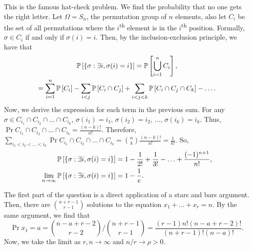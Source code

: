 \begin{solution}
    This is the famous hat-check problem. We find the probability that no one
    gets the right letter. Let $\Omega = S_n$, the permutation group of $n$
    elements, also let $C_i$ be the set of all permutations where the
    $i$\textsuperscript{th} element is in the $i$\textsuperscript{th} position.
    Formally, $\sigma \in C_i$ if and only if $\sigma(i) = i$. Then, by the
    inclusion-exclusion principle, we have that 
    \begin{gather*}
        \mathbb{P}\left[\left\{ \sigma: \exists i, \sigma(i) = i \right\}\right] = \mathbb{P}\left[\bigcup_{i=1}^n C_i\right], \\
        = \sum_{i=1}^n \mathbb{P}\left[C_i\right] - \sum_{i < j} \mathbb{P}\left[C_i \cap C_j\right] + \sum_{i < j < k} \mathbb{P}\left[C_i \cap C_j \cap C_k\right] - \ldots.
    \end{gather*}
    Now, we derive the expression for each term in the previous sum. For any
    $\sigma \in C_{i_1} \cap C_{i_2} \cap \ldots \cap C_{i_k}$, $\sigma(i_1) =
    i_1$, $\sigma(i_2) = i_2$, $\ldots$, $\sigma(i_k) = i_k$. Thus, $\Pr{C_{i_1}
    \cap C_{i_2} \cap \ldots \cap C_{i_k}} = \frac{(n-k)!}{n!}$. Therefore,
    $\sum_{i_1 < i_2 < \ldots < i_k} \Pr{C_{i_1} \cap C_{i_2} \cap \ldots \cap
    C_{i_k}} = \binom{n}{k}\frac{(n-k)!}{n!} = \frac{1}{k!}$. So,
    \begin{align*}
        \mathbb{P}\left[\left\{ \sigma: \exists i, \sigma(i) = i \right\}\right] &= 1 - \frac{1}{2!} + \frac{1}{3!} - \ldots + \frac{(-1)^{n+1}}{n!}, \\
        \lim_{n\to\infty} \mathbb{P}\left[\left\{ \sigma: \exists i, \sigma(i) = i \right\}\right] &= 1 - \frac{1}{e}.
    \end{align*}
\end{solution}
\begin{problem}{6}
\end{problem}
\begin{solution}
    The first part of the question is a direct application of a stars and bars
    argument. Then, there are $\binom{n+r-1}{r-1}$ solutions to the equation
    $x_1 + \ldots + x_r = n$. By the same argument, we find that 
    \[
        \Pr{x_1 = a} = \binom{n-a+r-2}{r-2} / \binom{n+r-1}{r-1} =  \frac{(r-1)n!(n-a+r-2)!}{(n+r-1)!(n-a)!}.
    \]
    Now, we take the limit as $r,n\to\infty$ and $n/r \to \rho > 0$.
\end{solution}
\begin{problem}{7}
\end{problem}
